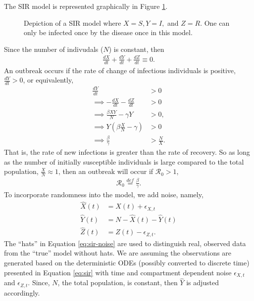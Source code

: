 \documentclass[12pt]{article}
\newcommand{\rr}{\ensuremath{\mathcal{R}_0}}
\begin{document}
The SIR model is represented graphically in Figure \ref{fig::sir}. 
\begin{figure}[h]
\centering
{}
\caption{Depiction of a SIR model where $X=S, Y=I,$ and $Z=R$.  One can only be infected once by the disease once in this model.}\label{fig::sir}
\end{figure}
Since the number of indivudals ($N$) is constant, then
\begin{align*}
\frac{dX}{dt} + \frac{dY}{dt} + \frac{dZ}{dt} \equiv 0.
\end{align*}
An outbreak occurs if the rate of change of infectious individuals is positive, $\frac{dY}{dt} > 0$, or equivalently,
\begin{align*}
  \frac{dY}{dt} &> 0 \\
  \implies -\frac{dX}{dt} - \frac{dZ}{dt} &> 0 \\
  \implies \frac{\beta X Y}{N}  - \gamma Y &> 0 ,\\
\implies  Y \left ( \beta \frac{X}{N} - \gamma \right ) & > 0\\
\implies   \frac{\beta}{\gamma} &> \frac{N}{X}.
\end{align*}
That is,  the rate of new infections is greater than the rate of recovery.  So as long as the number of initially susceptible individuals is large compared to the total population, $\frac{X}{N} \approx 1$, then an outbreak will occur if $\rr >1$,
\begin{align*}
  \rr \overset{def}{=} \frac{\beta}{\gamma}.
  \end{align*}
  To incorporate randomness into the model, we add noise, namely,
  \begin{align}\label{eq:sir-noise}
    \hat{X}(t) &= X(t) + \epsilon_{X,t}\\
    \hat{Y}(t) &=  N - \hat{X}(t) -\hat{Y}(t)  \nonumber\\
    \hat{Z}(t) &= Z(t) - \epsilon_{Z,t}. \nonumber
  \end{align}
The ``hats'' in Equation \ref{eq:sir-noise} are used to distinguish real, observed data from the ``true'' model without hats.  We are assuming the observations are generated based on the  deterministic ODEs (possibly converted to discrete time) presented in Equation \ref{eq:sir} with time and compartment dependent noise $\epsilon_{X,t}$ and $\epsilon_{Z,t}$.  Since, $N$, the total population, is constant, then $\hat{Y}$ is adjusted accordingly.
\end{document}
